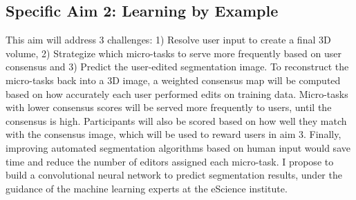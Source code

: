 
\subsection*{Specific Aim 2: Learning by Example}
This aim will address 3 challenges: 1) Resolve user input to create a final 3D volume, 2) Strategize which micro-tasks to serve more frequently based on user consensus and 3) Predict the user-edited segmentation image. To reconstruct the micro-tasks back into a 3D image, a weighted consensus map will be computed based on how accurately each user performed edits on training data. Micro-tasks with lower consensus scores will be served more frequently to users, until the consensus is high. Participants will also be scored based on how well they match with the consensus image, which will be used to reward users in aim 3. Finally, improving automated segmentation algorithms based on human input would save time and reduce the number of editors assigned each micro-task. I propose to build a convolutional neural network to predict segmentation results, under the guidance of the machine learning experts at the eScience institute. 

